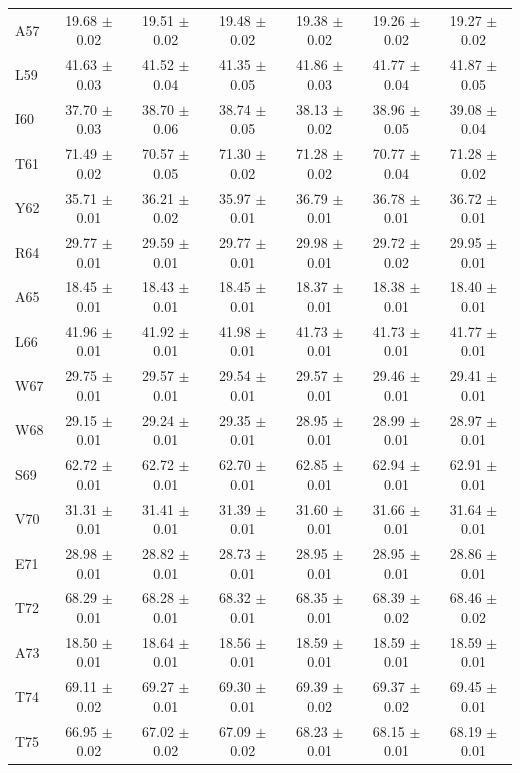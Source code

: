 \documentclass[%
 aip,
 amsmath,amssymb,
 preprint,%
]{revtex4-1}
\begin{document}
\begin{center}
\begin{longtable}{l|c|c|c|c|c|c}
A57 & 19.68 $\pm$ 0.02 & 19.51 $\pm$ 0.02 & 19.48 $\pm$ 0.02 & 19.38 $\pm$ 0.02 & 19.26 $\pm$ 0.02 & 19.27 $\pm$ 0.02 \\
L59 & 41.63 $\pm$ 0.03 & 41.52 $\pm$ 0.04 & 41.35 $\pm$ 0.05 & 41.86 $\pm$ 0.03 & 41.77 $\pm$ 0.04 & 41.87 $\pm$ 0.05 \\
I60 & 37.70 $\pm$ 0.03 & 38.70 $\pm$ 0.06 & 38.74 $\pm$ 0.05 & 38.13 $\pm$ 0.02 & 38.96 $\pm$ 0.05 & 39.08 $\pm$ 0.04 \\
T61 & 71.49 $\pm$ 0.02 & 70.57 $\pm$ 0.05 & 71.30 $\pm$ 0.02 & 71.28 $\pm$ 0.02 & 70.77 $\pm$ 0.04 & 71.28 $\pm$ 0.02 \\
Y62 & 35.71 $\pm$ 0.01 & 36.21 $\pm$ 0.02 & 35.97 $\pm$ 0.01 & 36.79 $\pm$ 0.01 & 36.78 $\pm$ 0.01 & 36.72 $\pm$ 0.01 \\
R64 & 29.77 $\pm$ 0.01 & 29.59 $\pm$ 0.01 & 29.77 $\pm$ 0.01 & 29.98 $\pm$ 0.01 & 29.72 $\pm$ 0.02 & 29.95 $\pm$ 0.01 \\
A65 & 18.45 $\pm$ 0.01 & 18.43 $\pm$ 0.01 & 18.45 $\pm$ 0.01 & 18.37 $\pm$ 0.01 & 18.38 $\pm$ 0.01 & 18.40 $\pm$ 0.01 \\
L66 & 41.96 $\pm$ 0.01 & 41.92 $\pm$ 0.01 & 41.98 $\pm$ 0.01 & 41.73 $\pm$ 0.01 & 41.73 $\pm$ 0.01 & 41.77 $\pm$ 0.01 \\
W67 & 29.75 $\pm$ 0.01 & 29.57 $\pm$ 0.01 & 29.54 $\pm$ 0.01 & 29.57 $\pm$ 0.01 & 29.46 $\pm$ 0.01 & 29.41 $\pm$ 0.01 \\
W68 & 29.15 $\pm$ 0.01 & 29.24 $\pm$ 0.01 & 29.35 $\pm$ 0.01 & 28.95 $\pm$ 0.01 & 28.99 $\pm$ 0.01 & 28.97 $\pm$ 0.01 \\
S69 & 62.72 $\pm$ 0.01 & 62.72 $\pm$ 0.01 & 62.70 $\pm$ 0.01 & 62.85 $\pm$ 0.01 & 62.94 $\pm$ 0.01 & 62.91 $\pm$ 0.01 \\
V70 & 31.31 $\pm$ 0.01 & 31.41 $\pm$ 0.01 & 31.39 $\pm$ 0.01 & 31.60 $\pm$ 0.01 & 31.66 $\pm$ 0.01 & 31.64 $\pm$ 0.01 \\
E71 & 28.98 $\pm$ 0.01 & 28.82 $\pm$ 0.01 & 28.73 $\pm$ 0.01 & 28.95 $\pm$ 0.01 & 28.95 $\pm$ 0.01 & 28.86 $\pm$ 0.01 \\
T72 & 68.29 $\pm$ 0.01 & 68.28 $\pm$ 0.01 & 68.32 $\pm$ 0.01 & 68.35 $\pm$ 0.01 & 68.39 $\pm$ 0.02 & 68.46 $\pm$ 0.02 \\
A73 & 18.50 $\pm$ 0.01 & 18.64 $\pm$ 0.01 & 18.56 $\pm$ 0.01 & 18.59 $\pm$ 0.01 & 18.59 $\pm$ 0.01 & 18.59 $\pm$ 0.01 \\
T74 & 69.11 $\pm$ 0.02 & 69.27 $\pm$ 0.01 & 69.30 $\pm$ 0.01 & 69.39 $\pm$ 0.02 & 69.37 $\pm$ 0.02 & 69.45 $\pm$ 0.01 \\
T75 & 66.95 $\pm$ 0.02 & 67.02 $\pm$ 0.02 & 67.09 $\pm$ 0.02 & 68.23 $\pm$ 0.01 & 68.15 $\pm$ 0.01 & 68.19 $\pm$ 0.01 \\

\end{longtable}
\end{center}
\end{document}
